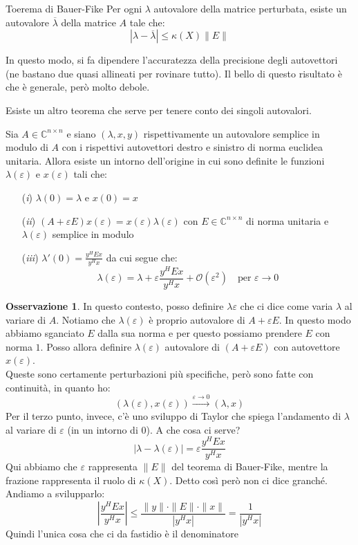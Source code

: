 \documentclass[11pt,a4paper,twoside]{article}
\newcommand{\vareps}{\varepsilon}
\theoremstyle{definition}
\newtheorem*{oss}{Osservazione}
\begin{document}
\begin{thm}{Toerema di Bauer-Fike}{}
	Per ogni $\lambda$ autovalore della matrice perturbata, esiste un autovalore $\overline \lambda$ della matrice $A$ tale che:
	\[|\lambda - \overline \lambda| \leq \kappa(X) \|E\|\]
\end{thm}

In questo modo, si fa dipendere l'accuratezza della precisione degli autovettori (ne bastano due quasi allineati per rovinare tutto). Il bello di questo risultato è che è generale, però molto debole.

Esiste un altro teorema che serve per tenere conto dei singoli autovalori.

\begin{thm}{}{}
	Sia $A \in \mathbb C^{n \times n}$ e siano $(\lambda, x, y)$ rispettivamente un autovalore semplice in modulo di $A$ con i rispettivi autovettori destro e sinistro di norma euclidea unitaria. Allora esiste un intorno dell'origine in cui sono definite le funzioni $\lambda(\varepsilon)$ e $x (\varepsilon)$ tali che:
	\begin{itemize}
		\item[(\textit i)] $\lambda(0) = \lambda$ e $x(0) = x$
		\item[(\textit{ii})] $(A+\varepsilon E) x(\varepsilon) = x(\varepsilon)\lambda(\varepsilon)$ con $E \in \mathbb C^{n \times n}$ di norma unitaria e $\lambda(\varepsilon)$ semplice in modulo
		\item[(\textit{iii})] $\lambda'(0) = \frac{y^H Ex}{y^Hx}$ da cui segue che:
			\[ \lambda(\varepsilon) = \lambda + \varepsilon \frac{y^HEx}{y^Hx} + \mathcal O(\varepsilon^2) \quad \text{per }\varepsilon \to 0\]
	\end{itemize}
\end{thm}

\begin{oss}
	In questo contesto, posso definire $\lambda{\varepsilon}$ che ci dice come varia $\lambda$ al variare di $A$. Notiamo che $\lambda(\varepsilon)$ è proprio autovalore di $A + \vareps E$. In questo modo abbiamo sganciato $E$ dalla sua norma e per questo possiamo prendere $E$ con norma $1$. Posso allora definire $\lambda(\vareps)$ autovalore di $(A + \vareps E)$ con autovettore $x (\vareps)$.\\
	Queste sono certamente perturbazioni più specifiche, però sono fatte con continuità, in quanto ho:
	\[ (\lambda(\vareps),x(\vareps)) \xrightarrow{\vareps \to 0} (\lambda, x)\]
	Per il terzo punto, invece, c'è uno sviluppo di Taylor che spiega l'andamento di $\lambda$ al variare di $\vareps$ (in un intorno di $0$). A che cosa ci serve?
	\[ |\lambda - \lambda(\vareps)| = \vareps\frac{y^HEx}{y^Hx} \]
	Qui abbiamo che $\vareps$ rappresenta $\| E \|$ del teorema di Bauer-Fike, mentre la frazione rappresenta il ruolo di $\kappa(X)$. Detto così però non ci dice granché. Andiamo a svilupparlo:
	\[ \left| \frac{y^HEx}{y^Hx} \right| \leq \frac{\|y\| \cdot \|E\| \cdot \|x\|}{|y^Hx|} = \frac 1{|y^Hx|}\]
	Quindi l'unica cosa che ci da fastidio è il denominatore
\end{oss}
\end{document}
